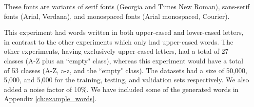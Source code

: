 These fonts are variants of serif fonts (Georgia and Times New Roman), sans-serif fonts (Arial, Verdana), and monospaced fonts (Arial monospaced, Courier).

This experiment had words written in both upper-cased and lower-cased letters, in contrast to the other experiments which only had upper-cased words. The other experiments, having exclusively upper-cased letters, had a total of 27 classes (A-Z plus an ``empty" class), whereas this experiment would have a total of 53 classes (A-Z, a-z, and the ``empty" class). The datasets had a size of 50,000, 5,000, and 5,000 for the training, testing, and validation sets respectively. We also added a noise factor of 10\%. We have included some of the generated words in Appendix \ref{ch:example_words}.
